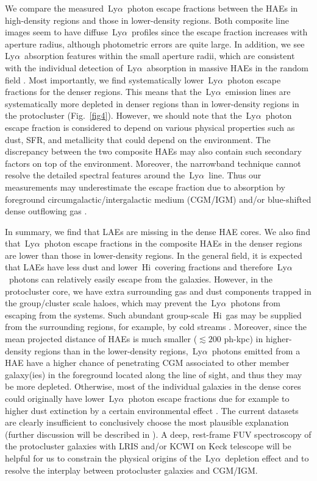 \documentclass[letters,usenatbib]{mnras}
\def\lya{{\rm\,Ly$\alpha$}}
\def\hi{{\rm\,H{\sc i}}}
\begin{document}
We compare the measured \lya\ photon escape fractions between the HAEs in 
high-density regions and those in lower-density regions. Both composite line 
images seem to have diffuse \lya\ profiles since the escape fraction increases 
with aperture radius, although photometric errors are quite large. In addition, we 
see \lya\ absorption features within the small aperture radii, which are 
consistent with the individual detection of \lya\ absorption in massive HAEs in 
the random field \citep{Shimakawa:2016}. Most importantly, we find systematically 
lower \lya\ photon escape fractions for the denser regions. This means that the 
\lya\ emission lines are systematically more depleted in denser regions than 
in lower-density regions in the protocluster (Fig.~\ref{fig4}). However, 
we should note that the \lya\ photon escape fraction is considered to depend on 
various physical properties such as dust, SFR, and metallicity 
\citep{Hayes:2010,Matthee:2016} that could depend on the environment. 
The discrepancy between the two composite HAEs may also contain such secondary
factors on top of the environment. Moreover, the narrowband technique cannot resolve 
the detailed spectral features around the \lya\ line. Thus our measurements may 
underestimate the escape fraction due to absorption by foreground 
circumgalactic/intergalactic medium (CGM/IGM) \citep{Hayes:2006} 
and/or blue-shifted dense outflowing gas \citep{Reddy:2016b}. 

In summary, we find that LAEs are missing in the dense HAE cores. We also find 
that \lya\ photon escape fractions in the composite HAEs in the denser regions 
are lower than those in lower-density regions. In the general field, it is 
expected that LAEs have less dust and lower \hi\ covering fractions
\citep{Shibuya:2014b,Reddy:2016b} and therefore \lya\ photons can relatively 
easily escape from the galaxies. However, in the protocluster core, 
we have extra surrounding gas and dust components trapped in the group/cluster 
scale haloes, which may prevent the \lya\ photons from escaping from the systems. 
Such abundant group-scale \hi\ gas may be supplied from the surrounding regions, 
for example, by cold streams \citep{Dekel:2009,Dekel:2009b}. Moreover, since the 
mean projected distance of 
HAEs is much smaller ($\lesssim200$ ph-kpc) in higher-density regions than in the 
lower-density regions, \lya\ photons emitted from a HAE have a higher chance of 
penetrating CGM associated to other member galaxy(ies) in the foreground located 
along the line of sight, and thus they may be more depleted. Otherwise, most of 
the individual galaxies in the dense cores could originally have lower \lya\ 
photon escape fractions due for example to higher dust extinction by a certain
environmental effect \citep{Koyama:2013b}. The current datasets 
are clearly insufficient to conclusively choose the most plausible explanation 
(further discussion will be described in \citealt{Shimakawa:2017b}).
A deep, rest-frame FUV spectroscopy of the protocluster galaxies with LRIS and/or 
KCWI on Keck telescope will be helpful for us to constrain the physical origins of 
the \lya\ depletion effect and to resolve the interplay between protocluster 
galaxies and CGM/IGM. 
\end{document}
